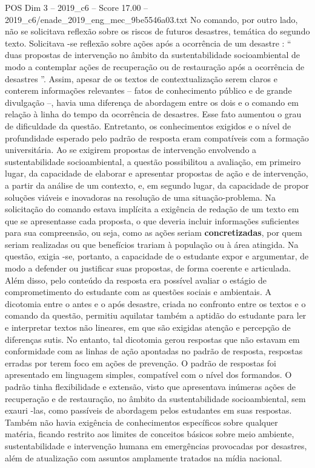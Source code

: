 \begin{textsample}{POS Dim 3 – 2019\_c6 – Score 17.00 – 2019\_c6/enade\_2019\_eng\_mec\_9be5546a03.txt}
No comando, por outro lado, não se solicitava reflexão sobre os riscos de futuros desastres, temática do segundo texto.
Solicitava -se reflexão sobre ações após a ocorrência de um desastre : “ duas propostas de intervenção no âmbito da sustentabilidade socioambiental de modo a contemplar ações de recuperação ou de restauração após a ocorrência de desastres ”.
Assim, apesar de os textos de contextualização serem claros e conterem informações relevantes – fatos de conhecimento público e de grande divulgação –, havia uma diferença de abordagem entre os dois e o comando em relação à linha do tempo da ocorrência de desastres.
Esse fato aumentou o grau de dificuldade da questão.
Entretanto, os conhecimentos exigidos e o nível de profundidade esperado pelo padrão de resposta eram compatíveis com a formação universitária.
Ao se exigirem propostas de intervenção envolvendo a sustentabilidade socioambiental, a questão possibilitou a avaliação, em primeiro lugar, da capacidade de elaborar e apresentar propostas de ação e de intervenção, a partir da análise de um contexto, e, em segundo lugar, da capacidade de propor soluções viáveis e inovadoras na resolução de uma situação-problema.
Na solicitação do comando estava implícita a exigência de redação de um texto em que se apresentasse cada proposta, o que deveria incluir informações suficientes para sua compreensão, ou seja, como as ações seriam \textbf{concretizadas}, por quem seriam realizadas ou que benefícios trariam à população ou à área atingida.
Na questão, exigia -se, portanto, a capacidade de o estudante expor e argumentar, de modo a defender ou justificar suas propostas, de forma coerente e articulada.
Além disso, pelo conteúdo da resposta era possível avaliar o estágio de comprometimento do estudante com as questões sociais e ambientais.
A dicotomia entre o antes e o após desastre, criada no confronto entre os textos e o comando da questão, permitiu aquilatar também a aptidão do estudante para ler e interpretar textos não lineares, em que são exigidas atenção e percepção de diferenças sutis.
No entanto, tal dicotomia gerou respostas que não estavam em conformidade com as linhas de ação apontadas no padrão de resposta, respostas erradas por terem foco em ações de prevenção.
O padrão de respostas foi apresentado em linguagem simples, compatível com o nível dos formandos.
O padrão tinha flexibilidade e extensão, visto que apresentava inúmeras ações de recuperação e de restauração, no âmbito da sustentabilidade socioambiental, sem exauri -las, como passíveis de abordagem pelos estudantes em suas respostas.
Também não havia exigência de conhecimentos específicos sobre qualquer matéria, ficando restrito aos limites de conceitos básicos sobre meio ambiente, sustentabilidade e intervenção humana em emergências provocadas por desastres, além de atualização com assuntos amplamente tratados na mídia nacional.

\end{textsample}
